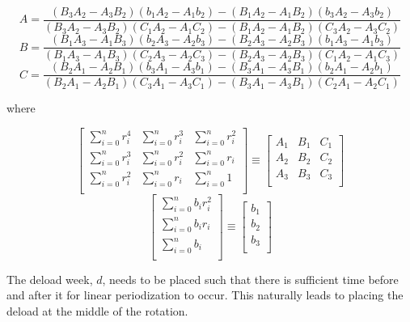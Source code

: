 \begin{equation}
    A=\frac{(B_3 A_2-A_3 B_2)(b_1 A_2-A_1 b_2)-(B_1 A_2-A_1 B_2)(b_3 A_2-A_3 b_2)}
           {(B_3 A_2-A_3 B_2)(C_1 A_2-A_1 C_2)-(B_1 A_2-A_1 B_2)(C_3 A_2-A_3 C_2)}
\end{equation}
\begin{equation}
    B=\frac{(B_1 A_3-A_1 B_3)(b_2 A_3-A_2 b_3)-(B_2 A_3-A_2 B_3)(b_1 A_3-A_1 b_3)}
           {(B_1 A_3-A_1 B_3)(C_2 A_3-A_2 C_3)-(B_2 A_3-A_2 B_3)(C_1 A_2-A_1 C_3)}
\end{equation}
\begin{equation}
    C=\frac{(B_2 A_1-A_2 B_1)(b_3 A_1-A_3 b_1)-(B_3 A_1- A_3 B_1)(b_2 A_1-A_2 b_1)}
           {(B_2 A_1-A_2 B_1)(C_3 A_1-A_3 C_1)-(B_3 A_1- A_3 B_1)(C_2 A_1-A_2 C_1)}
\end{equation}
\centerline{where}
\begin{equation*}
    \begin{bmatrix}
        \sum_{i=0}^{n}r_i^4 & \sum_{i=0}^{n}r_i^3 & \sum_{i=0}^{n}r_i^2\\
        \sum_{i=0}^{n}r_i^3 & \sum_{i=0}^{n}r_i^2 & \sum_{i=0}^{n}r_i\\
        \sum_{i=0}^{n}r_i^2 & \sum_{i=0}^{n}r_i & \sum_{i=0}^{n}1\\
    \end{bmatrix}
    \equiv
    \begin{bmatrix}
        A_1 & B_1 & C_1\\
        A_2 & B_2 & C_2\\
        A_3 & B_3 & C_3\\
    \end{bmatrix}
\end{equation*}
\begin{equation*}
    \begin{bmatrix}
        \sum_{i=0}^{n}b_ir_i^2 \\
        \sum_{i=0}^{n}b_ir_i \\
        \sum_{i=0}^{n}b_i \\
    \end{bmatrix}
    \equiv
    \begin{bmatrix}
        b_1 \\
        b_2 \\
        b_3 \\
    \end{bmatrix}
\end{equation*}

The deload week, $d$, needs to be placed such that there is sufficient time before and after it for linear periodization to occur. This naturally leads to placing the deload at the middle of the rotation.

